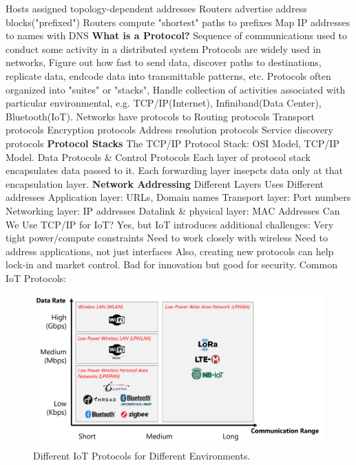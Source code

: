 \documentclass[11 pt]{scrartcl}
\begin{document}
\itemnum
    \ii Hosts assigned topology-dependent addresses
    \ii Routers advertise address blocks("prefixed")
    \ii Routers compute "shortest" paths to prefixes
    \ii Map IP addresses to names with DNS
\itemend
\textbf{What is a Protocol?}\newline
\itemnum
    \ii Sequence of communications used to conduct some activity in a distributed system
    \ii Protocols are widely used in networks, Figure out how fast to send data, discover paths to destinations, replicate data, endcode data into transmittable patterns, etc.
    \ii Protocols often organized into "suites" or "stacks", Handle collection of activities associated with particular environmental, e.g. TCP/IP(Internet), Infiniband(Data Center), Bluetooth(IoT).
\itemend
Networks have protocols to 
\itemnum
    \ii Routing protocols 
    \ii Transport protocols
    \ii Encryption protocols
    \ii Address resolution protocols
    \ii Service discovery protocols
\itemend
\textbf{Protocol Stacks}\newline
The TCP/IP Protocol Stack: OSI Model, TCP/IP Model. Data Protocols \& Control Protocols\newline 
Each layer of protocol stack encapsulates data passed to it. 
Each forwarding layer insepcts data only at that encapsulation layer.\newline
\textbf{Network Addressing}\newline
Different Layers Uses Different addresses
\itemnum
    \ii Application layer: URLs, Domain names
    \ii Transport layer: Port numbers
    \ii Networking layer: IP addresses
    \ii Datalink \& physical layer: MAC Addresses
\itemend
Can We Use TCP/IP for IoT? Yes, but IoT introduces additional challenges:
\itemnum
    \ii Very tight power/compute constraints
    \ii Need to work closely with wireless
    \ii Need to address applications, not just interfaces
\itemend
Also, creating new protocols can help lock-in and market control. Bad for innovation but good for security.\newline
Common IoT Protocols:  
\begin{figure}[!htb]
    \centering
    \includegraphics[scale=0.6]{assets/iot_protocols.png}
    \caption{Different IoT Protocols for Different Environments.}
\end{figure}
\end{document}
